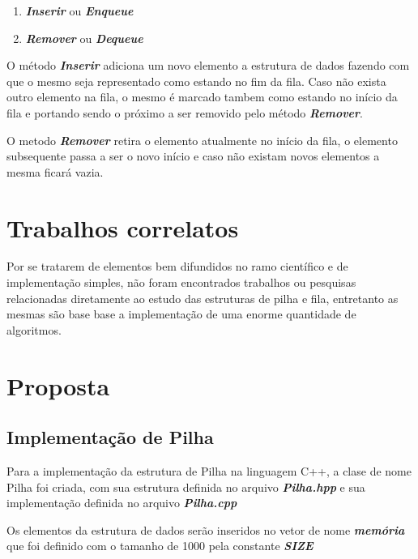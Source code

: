 \documentclass[rascunho,xindy,sublist]{fei}
\begin{document}
\begin{enumerate}
  \item \textbf{\textit{Inserir}} ou \textbf{\textit{Enqueue}}
  \item \textbf{\textit{Remover}} ou \textbf{\textit{Dequeue}}
\end{enumerate}

O método \textbf{\textit{Inserir}} adiciona um novo elemento a estrutura de dados fazendo com que o mesmo seja representado como estando no fim da fila. Caso não exista outro elemento na fila, o mesmo é marcado tambem como estando no início da fila e portando sendo o próximo a ser removido pelo método  \textbf{\textit{Remover}}. 

O metodo \textbf{\textit{Remover}} retira o elemento atualmente no início da fila, o elemento subsequente passa a ser o novo início e caso não existam novos elementos a mesma ficará vazia.

\chapter{Trabalhos correlatos}

Por se tratarem de elementos bem difundidos no ramo científico e de implementação simples, não foram encontrados trabalhos ou pesquisas relacionadas diretamente ao estudo das estruturas de pilha e fila, entretanto as mesmas são base base a implementação de uma enorme quantidade de algoritmos.

\chapter{Proposta}

\section{Implementação de Pilha}

Para a implementação da estrutura de Pilha na linguagem C++, a clase de nome Pilha foi criada, com sua estrutura definida no arquivo \textbf{\textit{Pilha.hpp}} e sua implementação definida no arquivo \textbf{\textit{Pilha.cpp}}

Os elementos da estrutura de dados serão inseridos no vetor de nome  \textbf{\textit{memória}} que foi definido com o tamanho de 1000 pela constante \textbf{\textit{SIZE}} 
\end{document}
